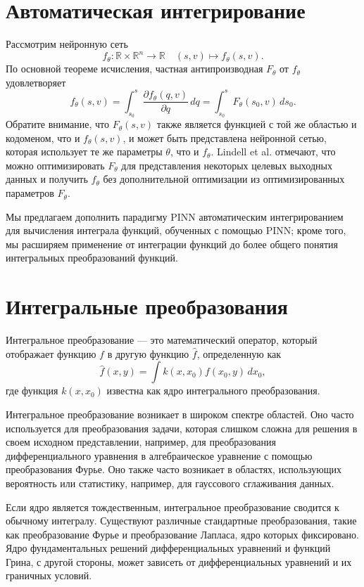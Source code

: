 \documentclass[a4paper,12pt]{article}
\theoremstyle{plain} %
\theoremstyle{definition} %
\theoremstyle{remark} %
\begin{document}
\section{Автоматическая интегрирование}

Рассмотрим нейронную сеть
\[
f_\theta : \mathbb{R} \times \mathbb{R}^n \rightarrow \mathbb{R} \quad (s, v) \mapsto f_\theta(s, v).
\]
По основной теореме исчисления, частная антипроизводная \(F_\theta\) от \(f_\theta\) удовлетворяет
\[
f_\theta(s, v) = \int_{s_0}^s \frac{\partial f_\theta(q, v)}{\partial q} \, dq = \int_{s_0}^s F_\theta(s_0, v) \, ds_0.
\]
Обратите внимание, что \(F_\theta(s, v)\) также является функцией с той же областью и кодоменом, что и \(f_\theta(s, v)\), и может быть представлена нейронной сетью, которая использует те же параметры \(\theta\), что и \(f_\theta\). Lindell et al. отмечают, что можно оптимизировать \(F_\theta\) для представления некоторых целевых выходных данных и получить \(f_\theta\) без дополнительной оптимизации из оптимизированных параметров \(F_\theta\). 

Мы предлагаем дополнить парадигму PINN автоматическим интегрированием для вычисления интеграла функций, обученных с помощью PINN; кроме того, мы расширяем применение от интеграции функций до более общего понятия интегральных преобразований функций.

\section{Интегральные преобразования}

Интегральное преобразование — это математический оператор, который отображает функцию \(f\) в другую функцию \(\hat{f}\), определенную как
\[
\hat{f}(x, y) = \int k(x, x_0) f(x_0, y) \, dx_0,
\]
где функция \(k(x, x_0)\) известна как ядро интегрального преобразования.

Интегральное преобразование возникает в широком спектре областей. Оно часто используется для преобразования задачи, которая слишком сложна для решения в своем исходном представлении, например, для преобразования дифференциального уравнения в алгебраическое уравнение с помощью преобразования Фурье. Оно также часто возникает в областях, использующих вероятность или статистику, например, для гауссового сглаживания данных.

Если ядро является тождественным, интегральное преобразование сводится к обычному интегралу. Существуют различные стандартные преобразования, такие как преобразование Фурье и преобразование Лапласа, ядро которых фиксировано. Ядро фундаментальных решений дифференциальных уравнений и функций Грина, с другой стороны, может зависеть от дифференциальных уравнений и их граничных условий.
\end{document}
